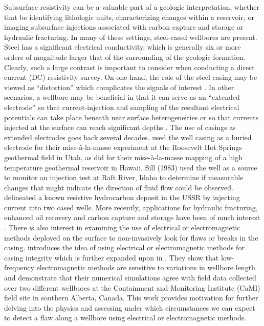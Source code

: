 \documentclass[extra,mreferee]{gji}
\begin{document}
Subsurface resistivity can be a valuable part of a geologic interpretation, whether that be identifying lithologic units, characterizing changes within a reservoir, or imaging subsurface injections associated with carbon capture and storage or hydraulic fracturing. In many of these settings, steel-cased wellbores are present. Steel has a significant electrical conductivity, which is generally six or more orders of magnitude larger that of the surrounding of the geologic formation. Clearly, such a large contrast is important to consider when conducting a direct current (DC) resistivity survey. On one-hand, the role of the steel casing may be viewed as ``distortion'' which complicates the signals of interest \citep{Wait1983, Holladay1984, Johnston1987}. In other scenarios, a wellbore may be beneficial in that it can serve as an ``extended electrode'' so that current-injection and sampling of the resultant electrical potentials can take place beneath near surface heterogeneities \citep{Ramirez1996, Rucker2010, Rucker2012, Ronczka2015} or so that currents injected at the surface can reach significant depths \citep{Schenkel1994, Weiss2016, hoversten2017borehole}. The use of casings as extended electrodes goes back several decades. \cite{Sill1978} used the well casing as a buried electrode for their mise-\`a-la-masse experiment at the Roosevelt Hot Springs geothermal field in Utah, as did \cite{osti_6375177} for their mise-\`a-la-masse mapping of a high temperature geothermal reservoir in Hawaii. Sill (1983) used the well as a source to monitor an injection test at Raft River, Idaho to determine if measurable changes that might indicate the direction of fluid flow could be observed. \cite{Rocroi1985} delineated a known resistive hydrocarbon deposit in the USSR by injecting current into two cased wells. More recently, applications for hydraulic fracturing, enhanced oil recovery and carbon capture and storage have been of much interest \citep{Commer2015, Tietze2015, Um2015, Weiss2016, hoversten2017borehole}. There is also interest in examining the use of electrical or electromagnetic methods deployed on the surface to non-invasively look for flaws or breaks in the casing. \cite{Wilt2018} introduces the idea of using electrical or electromagnetic methods for casing integrity which is further expanded upon in \cite{Wilt2018a}. They show that low-frequency electromagnetic methods are sensitive to variations in wellbore length and demonstrate that their numerical simulations agree with field data collected over two different wellbores at the Containment and Monitoring Institute (CaMI) field site in southern Alberta, Canada. This work provides motivation for further delving into the physics and assessing under which circumstances we can expect to detect a flaw along a wellbore using electrical or electromagnetic methods.
\end{document}
